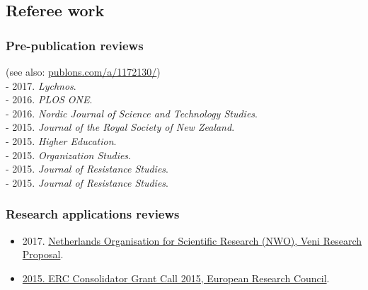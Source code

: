 \documentclass[a4paper,11pt,oneside]{article}
\begin{document}


\subsection{Referee work}

    \subsubsection{Pre-publication reviews}
    (see also: \href{publons.com/a/1172130/}{publons.com/a/1172130/})\\
    - 2017. \emph{Lychnos}.\\
    - 2016. \emph{PLOS ONE}. \\
    - 2016. \emph{Nordic Journal of Science and Technology Studies}.\\
    - 2015. \emph{Journal of the Royal Society of New Zealand}. \\
    - 2015. \emph{Higher Education}.\\
    - 2015. \emph{Organization Studies}.\\
    - 2015. \emph{Journal of Resistance Studies}.\\
    - 2015. \emph{Journal of Resistance Studies}. \\

    \subsubsection{Research applications reviews}
    \begin{itemize}
      \item 2017. \href{http://files.christopherkullenberg.se/NWOreview.pdf}{Netherlands Organisation for Scientific Research (NWO), Veni Research Proposal}.
      \item \href{http://files.christopherkullenberg.se/erc.pdf}{2015. ERC Consolidator Grant Call 2015, European Research Council}.
    \end{itemize}
\end{document}
